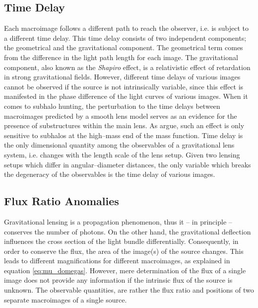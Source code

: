 \documentclass[a4wide,12pt]{book}
\newcommand{\ignore}[1]{}
\begin{document}
{\subsection{Time Delay}
Each macroimage follows a different path to reach the observer, i.e. is subject to a different time delay. This time delay consists of two independent components; the geometrical and the gravitational component. The geometrical term comes from the difference in the light path length for each image. The gravitational component, also known as the \emph{Shapiro} effect, is a relativistic effect of retardation in strong gravitational fields. However, different time delays of various images cannot be observed if the source is not intrinsically variable, since this effect is manifested in the phase difference of the light curves of various images. When it comes to subhalo hunting, the perturbation to the time delays between macroimages predicted by a smooth lens model serves as an evidence for the presence of substructures within the main lens\ignore{ (see Figure \hyperref[fig:time_delay]{2.4})}. As \citet{Moustakas+2009} argue, such an effect is only sensitive to subhalos at the high--mass end of the mass function. Time delay is the only dimensional quantity among the observables of a gravitational lens system, i.e. changes with the length scale of the lens setup. Given two lensing setups which differ in angular--diameter distances, the only variable which breaks the degeneracy of the observables is the time delay of various images.
 
 
 
\subsection{Flux Ratio Anomalies}
\label{subsec:Flux Ratio Anomalies}
Gravitational lensing is a propagation phenomenon, thus it -- in principle -- conserves the number of photons. On the other hand, the gravitational deflection influences the cross section of the light bundle differentially. Consequently, in order to conserve the flux, the area of the image(s) of the source changes. This leads to different magnifications for different macroimages, as explained in equation \ref{eq:mu_domegas}. However, mere determination of the flux of a single image does not provide any information if the intrinsic flux of the source is unknown. The observable quantities, are rather the flux ratio and positions of two separate macroimages of a single source.

}
\end{document}
